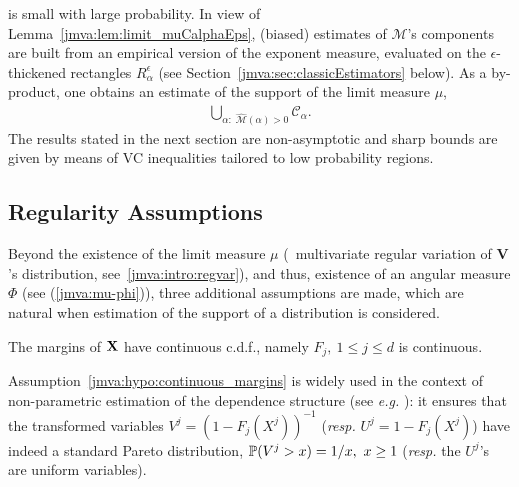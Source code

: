 is small with large probability.  %
In view of Lemma~\ref{jmva:lem:limit_muCalphaEps}, (biased) estimates of
$\mathcal{M}$'s components are built from an empirical version of 
the exponent measure, evaluated on the
$\epsilon$-thickened rectangles $R_\alpha^\epsilon$ (see Section~\ref{jmva:sec:classicEstimators} below). As a by-product, one obtains an estimate of the support of the limit measure $\mu$,
\begin{align}
\bigcup_{\alpha:\; \widehat{\mathcal{M}}(\alpha)>0 }\mathcal{C}_{\alpha}. \nonumber
\end{align}
 The results stated in the next section are non-asymptotic and sharp bounds are given by means of {\sc VC} inequalities tailored to low probability regions.


\subsection{Regularity Assumptions}\label{jmva:sec:RegularAssumptions} %
Beyond the existence of the limit measure $\mu$ (\ie~multivariate regular variation of $\mathbf{V}$'s distribution, see~\eqref{jmva:intro:regvar}), and thus, existence of an angular measure $\Phi$ (see (\ref{jmva:mu-phi})),
three additional assumptions are made, which are natural when estimation of the support of a distribution is considered. 

\begin{assumption}\label{jmva:hypo:continuous_margins}
The margins of $\mb X$ have continuous c.d.f., namely $F_j,~1 \le j \le d$ is continuous.
\end{assumption}
\noindent
 Assumption~\ref{jmva:hypo:continuous_margins}
is widely used in the context of non-parametric estimation of the dependence
structure (see \emph{e.g.} \cite{Einmahl2009}): it ensures that the transformed variables $V^j = (1 -
F_j(X^j))^{-1}$ (\emph{resp.} $U^j =  1 -F_j(X^j)$) have indeed a
standard Pareto distribution, $\P(V^j>x) = 1/x,~ x\ge 1$ (\emph{resp.}
the $U^j$'s are uniform variables). 

